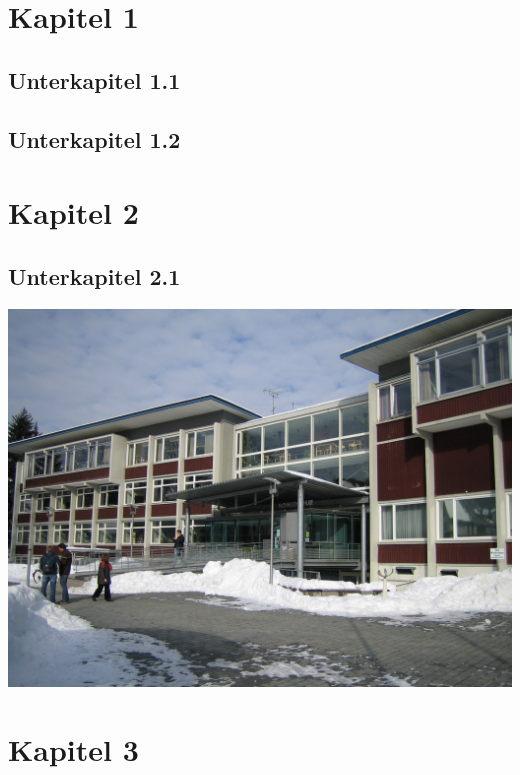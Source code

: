 \chapter{Kapitel 1}
\lipsum[2]
\section{Unterkapitel 1.1}
\lipsum[3]\cite{Tran_2008}
\section{Unterkapitel 1.2}
\lipsum[4]
\chapter{Kapitel 2}
\lipsum[5]
\section{Unterkapitel 2.1}
\lipsum[6]
\includegraphics*{images/HFU.jpg}
\chapter{Kapitel 3}
\lipsum[7]